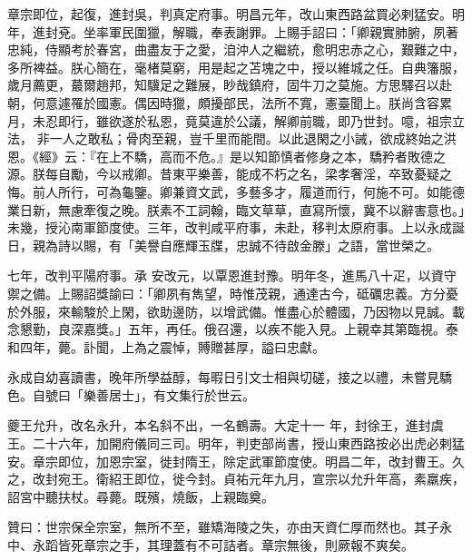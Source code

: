 \begin{pinyinscope}
 章宗即位，起復，進封吳，判真定府事。明昌元年，改山東西路盆買必剌猛安。明年，進封兗。坐率軍民圍獵，解職，奉表謝罪。上賜手詔曰：「卿親實肺腑，夙著忠純，侍顯考於春宮，曲盡友于之愛，洎沖人之繼統，愈明忠赤之心，艱難之中，多所裨益。朕心簡在，毫楮莫窮，用是起之苫塊之中，授以維城之任。自典籓服，歲月薦更，蕞爾趙邦，知驥足之難展，眇哉鎮府，固牛刀之莫施。方思驛召以赴朝，何意遽罹於國憲。偶因時獵，頗擾部民，法所不寬，憲臺聞上。朕尚含容累月，未忍即行，雖欲遂於私恩，竟莫違於公議，解卿前職，即乃世封。噫，祖宗立法，
 非一人之敢私；骨肉至親，豈千里而能間。以此退閑之小誡，欲成終始之洪恩。《經》云：『在上不驕，高而不危。』是以知節慎者修身之本，驕矜者敗德之源。朕每自勵，今以戒卿。昔東平樂善，能成不朽之名，梁孝奢淫，卒致憂疑之悔。前人所行，可為龜鑒。卿兼資文武，多藝多才，履道而行，何施不可。如能德業日新，無慮牽復之晚。朕素不工詞翰，臨文草草，直寫所懷，冀不以辭害意也。」未幾，授沁南軍節度使。三年，改判咸平府事，未赴，移判太原府事。上以永成誕日，親為詩以賜，有「美譽自應輝玉牒，忠誠不待啟金滕」之語，當世榮之。



 七年，改判平陽府事。承
 安改元，以覃恩進封豫。明年冬，進馬八十疋，以資守禦之備。上賜詔獎諭曰：「卿夙有雋望，時惟茂親，通達古今，砥礪忠義。方分憂於外服，來輸駿於上閑，欲助邊防，以增武備。惟盡心於體國，乃因物以見誠。載念懇勤，良深嘉獎。」五年，再任。俄召還，以疾不能入見。上親幸其第臨視。泰和四年，薨。訃聞，上為之震悼，賻贈甚厚，謚曰忠獻。



 永成自幼喜讀書，晚年所學益醇，每暇日引文士相與切磋，接之以禮，未嘗見驕色。自號曰「樂善居士」，有文集行於世云。



 夔王允升，改名永升，本名斜不出，一名鶴壽。大定十一
 年，封徐王，進封虞王。二十六年，加開府儀同三司。明年，判吏部尚書，授山東西路按必出虎必剌猛安。章宗即位，加恩宗室，徙封隋王，除定武軍節度使。明昌二年，改封曹王。久之，改封宛王。衛紹王即位，徙今封。貞祐元年九月，宣宗以允升年高，素羸疾，詔宮中聽扶杖。尋薨。既殯，燒飯，上親臨奠。



 贊曰：世宗保全宗室，無所不至，雖矯海陵之失，亦由天資仁厚而然也。其子永中、永蹈皆死章宗之手，其理蓋有不可詰者。章宗無後，則厥報不爽矣。



\end{pinyinscope}